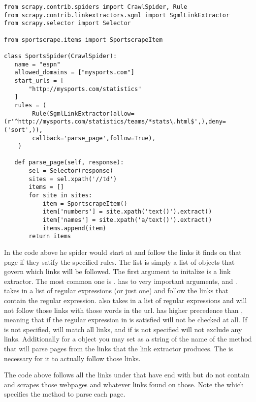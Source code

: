 \begin{lstlisting}
from scrapy.contrib.spiders import CrawlSpider, Rule
from scrapy.contrib.linkextractors.sgml import SgmlLinkExtractor
from scrapy.selector import Selector

from sportscrape.items import SportscrapeItem

class SportsSpider(CrawlSpider):
   name = "espn"
   allowed_domains = ["mysports.com"]
   start_urls = [
       "http://mysports.com/statistics"
   ]
   rules = (
        Rule(SgmlLinkExtractor(allow=(r'^http://mysports.com/statistics/teams/*stats\.html$',),deny=('sort',)),
		callback='parse_page',follow=True),
    )

   def parse_page(self, response):
       sel = Selector(response)
       sites = sel.xpath('//td')
       items = []
       for site in sites:
           item = SportscrapeItem()
           item['numbers'] = site.xpath('text()').extract()
           item['names'] = site.xpath('a/text()').extract()
           items.append(item)
       return items
\end{lstlisting}
In the code above he spider would start at  and follow the links it finds on that page if they satify the specified rules. 
The  list is simply a list of  objects that govern which links will be followed. 
The first argument to initalize  is a link extractor. The most common one is .
  has to very important arguments,  and . 
 takes in a list of regular expressions (or just one) and follow the links that contain the regular expression. 
 also takes in a list of regular expressions and will not follow those links with those words in the url. 
 has higher precedence than , meaning that if the regular expression in  is satisfied  will not be checked at all. 
If  is not specified,  will match all links, and if  is not specified  will not exclude any links. 
Additionally for a  object you may set  as a string of the name of the method that will parse pages from the links that the link extractor produces. 
The  is necessary for it to actually follow those links.

The code above follows all the links under  that have end with  but do not contain  and scrapes those webpages and whatever links found on those.
Note the  which specifies the  method to parse each page.


